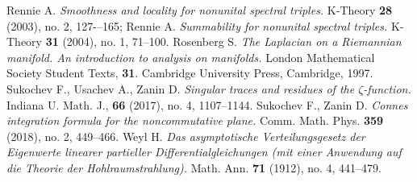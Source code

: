 \documentclass{article}
\begin{document}
\begin{thebibliography}{99}
 Rennie A. {\it Smoothness and locality for nonunital spectral triples.} K-Theory {\bf 28} (2003), no. 2, 127-–165; Rennie A. {\it Summability for nonunital spectral triples. } K-Theory {\bf 31} (2004), no. 1, 71--100.
 Rosenberg S. {\it The Laplacian on a Riemannian manifold. An introduction to analysis on manifolds.} London Mathematical Society Student Texts, {\bf 31}. Cambridge University Press, Cambridge, 1997.
 Sukochev F., Usachev A., Zanin D. {\it Singular traces and residues of the $\zeta$-function.} Indiana U. Math. J., {\bf 66} (2017), no. 4, 1107--1144.
 Sukochev F., Zanin D. {\it Connes integration formula for the noncommutative plane.} Comm. Math. Phys. {\bf 359} (2018), no. 2, 449--466.
 Weyl H. {\it Das asymptotische Verteilungsgesetz der Eigenwerte linearer partieller Differentialgleichungen (mit einer Anwendung auf die Theorie der Hohlraumstrahlung).} Math. Ann. {\bf 71} (1912), no. 4, 441--479. 

\end{thebibliography}
\end{document}
